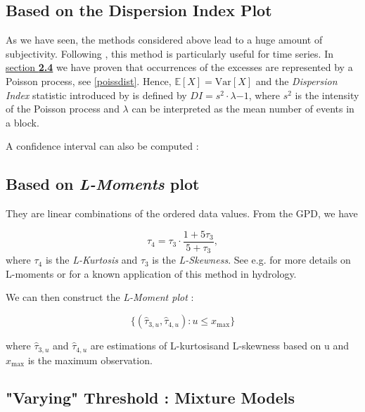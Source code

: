 \subsection*{Based on the Dispersion Index Plot}

As we have seen, the methods considered above lead to a huge amount of subjectivity.
Following \citet{ribatet_users_2006}, this method is particularly useful for time series. In \hyperref[poissonproc]{section \textbf{2.4}} we have proven that occurrences of the excesses are represented by a Poisson process, see \ref{poissdist}. Hence, $\mathbb{E}[X]=\text{Var}[X]$ and the \emph{Dispersion Index} statistic introduced by \cite{cunnane_note_1979} is 
defined by $DI=s^2\cdot\lambda{-1}$, where $s^2$ is the intensity of the Poisson process and $\lambda$ can be interpreted as the mean number of events in a block.

A confidence interval can also be computed :

\subsection*{Based on \emph{L-Moments} plot}

They are linear combinations of the ordered data values. 
From the GPD, we have 

\begin{equation}
\tau_4=\tau_3\cdot \frac{1+5\tau_3}{5+\tau_3},
\end{equation}
where $\tau_4$ is the \emph{L-Kurtosis} and $\tau_3$ is the \emph{L-Skewness}. See e.g. \citet{hosking_regional_1997} for more details on L-moments or \citet{peel_utility_2001} for a known application of this method in hydrology.

We can then construct the \emph{L-Moment plot} :

\begin{equation}
\Big\{(\hat{\tau}_{3,u},\hat{\tau}_{4,u}) : u\leq x_{\text{max}}\Big\}
\end{equation}

where $\hat{\tau}_{3,u}$ and $\hat{\tau}_{4,u}$ are estimations of L-kurtosisand L-skewness based on u and $x_{\text{max}}$ is the maximum observation.






\subsection{"Varying" Threshold : Mixture Models}
\citet{dey_extreme_2016}

